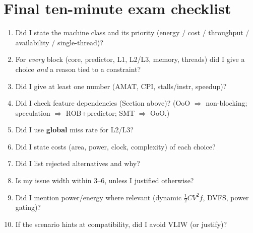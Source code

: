 \section{Final ten-minute exam checklist}
\begin{enumerate}[leftmargin=*]
\item Did I state the machine class and its priority (energy / cost / throughput / availability / single-thread)?
\item For \emph{every} block (core, predictor, L1, L2/L3, memory, threads) did I give a choice \emph{and} a reason tied to a constraint?
\item Did I give at least one number (AMAT, CPI, stalls/instr, speedup)?
\item Did I check feature dependencies (Section above)? (OoO $\Rightarrow$ non-blocking; speculation $\Rightarrow$ ROB+predictor; SMT $\Rightarrow$ OoO.)
\item Did I use \textbf{global} miss rate for L2/L3?
\item Did I state costs (area, power, clock, complexity) of each choice?
\item Did I list rejected alternatives and why?
\item Is my issue width within 3--6, unless I justified otherwise?
\item Did I mention power/energy where relevant (dynamic $\tfrac12CV^2f$, DVFS, power gating)?
\item If the scenario hints at compatibility, did I avoid VLIW (or justify)?
\end{enumerate}
